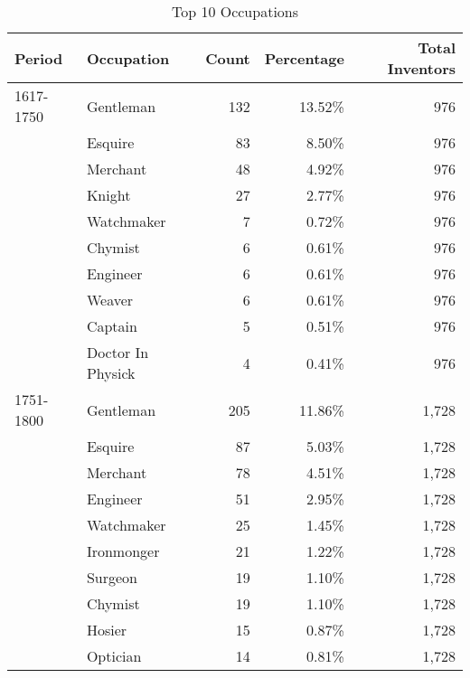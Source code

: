 \begin{table}[H]
\centering
\renewcommand{\arraystretch}{.65}
\caption{Top 10 Occupations}
\vspace{5mm}
\begin{tabular}{llrrr}
\toprule
\textbf{Period} & \textbf{Occupation} & \textbf{Count} & \textbf{Percentage} & \textbf{Total Inventors} \\
\midrule
1617-1750 & Gentleman            &   132 &  13.52\% & 976 \\
          & Esquire              &    83 &   8.50\% & 976 \\
          & Merchant             &    48 &   4.92\% & 976 \\
          & Knight               &    27 &   2.77\% & 976 \\
          & Watchmaker           &     7 &   0.72\% & 976 \\
          & Chymist              &     6 &   0.61\% & 976 \\
          & Engineer             &     6 &   0.61\% & 976 \\
          & Weaver               &     6 &   0.61\% & 976 \\
          & Captain              &     5 &   0.51\% & 976 \\
          & Doctor In Physick    &     4 &   0.41\% & 976 \\\midrule

1751-1800 & Gentleman            &   205 &  11.86\% & 1,728 \\
          & Esquire              &    87 &   5.03\% & 1,728 \\
          & Merchant             &    78 &   4.51\% & 1,728 \\
          & Engineer             &    51 &   2.95\% & 1,728 \\
          & Watchmaker           &    25 &   1.45\% & 1,728 \\
          & Ironmonger           &    21 &   1.22\% & 1,728 \\
          & Surgeon              &    19 &   1.10\% & 1,728 \\
          & Chymist              &    19 &   1.10\% & 1,728 \\
          & Hosier               &    15 &   0.87\% & 1,728 \\
          & Optician             &    14 &   0.81\% & 1,728 \\\midrule


\end{tabular}
\end{table}
